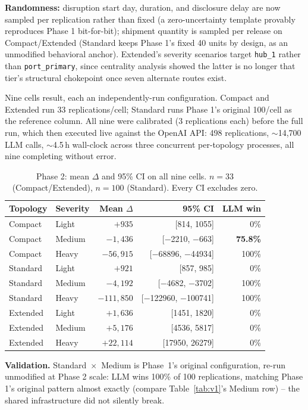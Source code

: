 \documentclass[10pt,twocolumn]{article}
\begin{document}
\textbf{Randomness:} disruption start day, duration, and disclosure delay are now sampled per replication rather than fixed (a zero-uncertainty template provably reproduces Phase 1 bit-for-bit); shipment quantity is sampled per release on Compact/Extended (Standard keeps Phase 1's fixed 40 units by design, as an unmodified behavioral anchor). Extended's severity scenarios target \texttt{hub\_1} rather than \texttt{port\_primary}, since centrality analysis showed the latter is no longer that tier's structural chokepoint once seven alternate routes exist.

Nine cells result, each an independently-run configuration. Compact and Extended run 33 replications/cell; Standard runs Phase 1's original 100/cell as the reference column. All nine were calibrated (3 replications each) before the full run, which then executed live against the OpenAI API: 498 replications, $\sim$14{,}700 LLM calls, $\sim$4.5\,h wall-clock across three concurrent per-topology processes, all nine completing without error.

\begin{table}[t]
\centering
\small
\begin{tabular}{@{}llrrr@{}}
\toprule
Topology & Severity & Mean $\Delta$ & 95\% CI & LLM win \\
\midrule
Compact  & Light  & $+935$ & [814, 1055]      & 0\% \\
Compact  & Medium & $-1{,}436$ & [$-$2210, $-$663] & \textbf{75.8\%} \\
Compact  & Heavy  & $-56{,}915$ & [$-$68896, $-$44934] & 100\% \\
Standard & Light  & $+921$ & [857, 985]        & 0\% \\
Standard & Medium & $-4{,}192$ & [$-$4682, $-$3702] & 100\% \\
Standard & Heavy  & $-111{,}850$ & [$-$122960, $-$100741] & 100\% \\
Extended & Light  & $+1{,}636$ & [1451, 1820]    & 0\% \\
Extended & Medium & $+5{,}176$ & [4536, 5817]    & 0\% \\
Extended & Heavy  & $+22{,}114$ & [17950, 26279]  & 0\% \\
\bottomrule
\end{tabular}
\caption{Phase 2: mean $\Delta$ and 95\% CI on all nine cells. $n=33$ (Compact/Extended), $n=100$ (Standard). Every CI excludes zero.}
\label{tab:v2}
\end{table}

\textbf{Validation.} Standard~$\times$~Medium is Phase~1's original configuration, re-run unmodified at Phase 2 scale: LLM wins 100\% of 100 replications, matching Phase 1's original pattern almost exactly (compare Table~\ref{tab:v1}'s Medium row) -- the shared infrastructure did not silently break.
\end{document}
